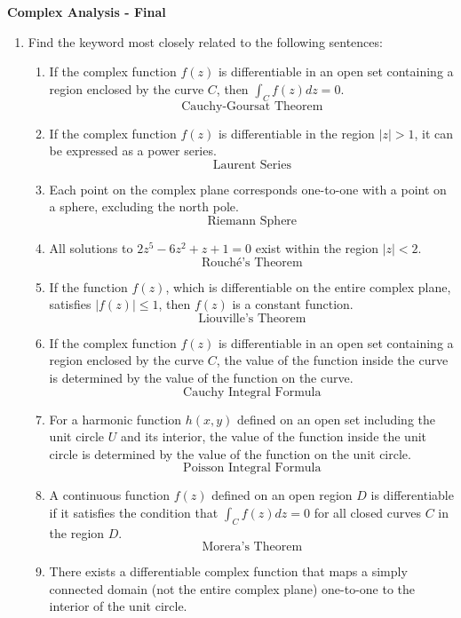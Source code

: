 \documentclass{article}
\theoremstyle{definition}
\newcommand{\abs}[1]{\left\lvert #1 \right\rvert}
\begin{document}
	\begin{center}
		\huge\textbf{Complex Analysis - Final}\\
		\vspace{0.5em}
	\end{center}
	
	\begin{enumerate}[\bf 1.]
		\item Find the keyword most closely related to the following sentences:
		\begin{enumerate}
			\item If the complex function $f(z)$ is differentiable in an open set containing a region enclosed by the curve $C$, then $\int_{C}f(z)dz=0$.\[
			\boxed{\text{Cauchy-Goursat Theorem}}
			\]
			\item If the complex function $f(z)$ is differentiable in the region $\abs{z} > 1$, it can be expressed as a power series.\[
			\boxed{\text{Laurent Series}}
			\]
			\item Each point on the complex plane corresponds one-to-one with a point on a sphere, excluding the north pole.\[
			\boxed{\text{Riemann Sphere}}
			\]
			\item All solutions to $2z^5 - 6z^2 + z + 1 = 0$ exist within the region $\abs{z} < 2$.\[
			\boxed{\text{Rouch\'{e}'s Theorem}}
			\]
			\item If the function $f(z)$, which is differentiable on the entire complex plane, satisfies $\abs{f(z)}\leq 1$, then $f(z)$ is a constant function. \[
			\boxed{\text{Liouville's Theorem}}
			\]
			\item If the complex function $f(z)$ is differentiable in an open set containing a region enclosed by the curve $C$, the value of the function inside the curve is determined by the value of the function on the curve. \[
			\boxed{\text{Cauchy Integral Formula}}
			\]
			\item For a harmonic function $h(x, y)$ defined on an open set including the unit circle $U$ and its interior, the value of the function inside the unit circle is determined by the value of the function on the unit circle. \[
			\boxed{\text{Poisson Integral Formula}}
			\]
			\item A continuous function $f(z)$ defined on an open region $D$ is differentiable if it satisfies the condition that $\int_{C}f(z)dz=0$ for all closed curves $C$ in the region $D$. \[
			\boxed{\text{Morera's Theorem}}
			\]
			\item There exists a differentiable complex function that maps a simply connected domain (not the entire complex plane) one-to-one to the interior of the unit circle. \[
\]
\end{enumerate}
\end{enumerate}
\end{document}
